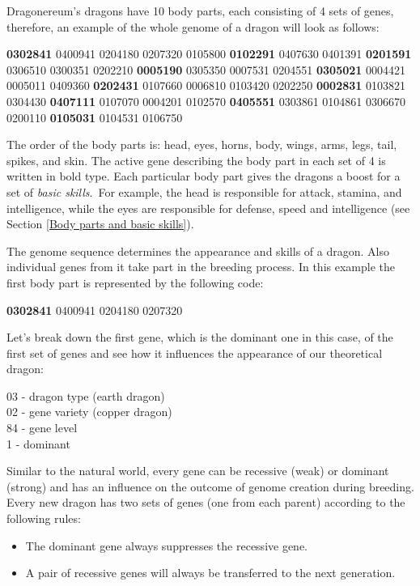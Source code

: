 \documentclass[12pt]{article}
\begin{document}
Dragonereum’s dragons have 10 body parts, each consisting of 4 sets of genes, therefore, an example of the whole genome of a dragon will look as follows:\par

\textbf{0302841} 0400941 0204180 0207320 0105800 \textbf{0102291} 0407630 0401391 \textbf{0201591} 0306510 0300351 0202210 \textbf{0005190} 0305350 0007531 0204551 \textbf{0305021} 0004421 0005011 0409360 \textbf{0202431} 0107660 0006810 0103420 0202250 \textbf{0002831} 0103821 0304430 \textbf{0407111} 0107070 0004201 0102570 \textbf{0405551} 0303861 0104861 0306670 0200110 \textbf{0105031} 0104531 0106750\par

The order of the body parts is: head, eyes, horns, body, wings, arms, legs, tail, spikes, and skin. The active gene describing the body part in each set of 4 is written in bold type. Each particular body part gives the dragons a boost for a set of\textit{ basic skills}.\ For example, the head is responsible for attack, stamina, and intelligence, while the eyes are responsible for defense, speed and intelligence (see Section \ref{Body parts and basic skills}).\par

The genome sequence determines the appearance and skills of a dragon. Also individual genes from it take part in the breeding process. In this example the first body part is represented by the following code:\par

\textbf{0302841} 0400941 0204180 0207320\par


\vspace{\baselineskip}

\begin{samepage}
Let's break down the first gene, which is the dominant one in this case, of the first set of genes and see how it influences the appearance of our theoretical dragon: 

03 - dragon type (earth dragon) \\
02 - gene variety (copper dragon) \\
84 - gene level \\
1 - dominant 
\end{samepage}

Similar to the natural world, every gene can be recessive (weak) or dominant (strong) and has an influence on the outcome of genome creation during breeding. Every new dragon has two sets of genes (one from each parent) according to the following rules:
\begin{itemize}
	\item The dominant gene always suppresses the recessive gene.
	\item A pair of recessive genes will always be transferred to the next generation.
\end{itemize}
\end{document}
